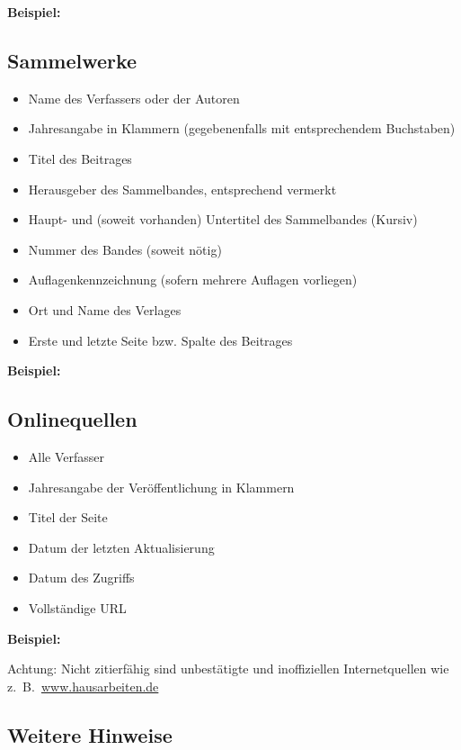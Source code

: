 \documentclass[a4paper,12pt]{scrartcl} %
\begin{document}
\textbf{Beispiel:}

\subsection{Sammelwerke}

\begin{itemize}
\item Name des Verfassers oder der Autoren
\item Jahresangabe in Klammern (gegebenenfalls mit entsprechendem Buchstaben)
\item Titel des Beitrages
\item Herausgeber des Sammelbandes, entsprechend vermerkt
\item Haupt- und (soweit vorhanden) Untertitel des Sammelbandes (Kursiv)
\item Nummer des Bandes (soweit nötig)
\item Auflagenkennzeichnung (sofern mehrere Auflagen vorliegen)
\item Ort und Name des Verlages
\item Erste und letzte Seite bzw. Spalte des Beitrages
\end{itemize}

\textbf{Beispiel:}

\subsection{Onlinequellen}

\begin{itemize}
\item Alle Verfasser
\item Jahresangabe der Veröffentlichung in Klammern
\item Titel der Seite
\item Datum der letzten Aktualisierung
\item Datum des Zugriffs
\item Vollständige URL
\end{itemize}

\textbf{Beispiel:}

Achtung: Nicht zitierfähig sind unbestätigte und inoffiziellen Internetquellen wie z.~B.\ \url{www.hausarbeiten.de}

\subsection{Weitere Hinweise}
\end{document}
